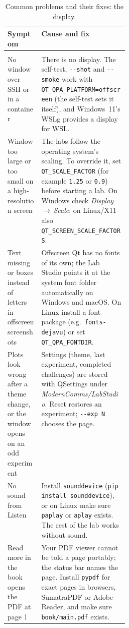 \begin{table}[htbp]\centering\footnotesize
\caption{Common problems and their fixes: the display.}\label{tab:appB:trouble3}
\renewcommand{\arraystretch}{1.2}
\begin{tabularx}{\linewidth}{@{}>{\raggedright\arraybackslash}p{0.28\linewidth}>{\raggedright\arraybackslash}X@{}}
\toprule
Symptom & Cause and fix\\
\midrule
\multicolumn{2}{@{}l}{\textit{Display}}\\
No window over SSH or in a container & There is no display. The self-test, \texttt{-{}-shot} and \texttt{-{}-smoke} work with \texttt{QT\_QPA\_PLATFORM=offscreen} (the self-test sets it itself), and Windows~11's WSLg provides a display for WSL.\\
Window too large or too small on a high-resolution screen & The labs follow the operating system's scaling. To override it, set \texttt{QT\_SCALE\_FACTOR} (for example \texttt{1.25} or \texttt{0.9}) before starting a lab. On Windows check \emph{Display\,$\to$\,Scale}; on Linux/X11 also \texttt{QT\_SCREEN\_SCALE\_FACTORS}.\\
Text missing or boxes instead of letters in offscreen screenshots & Offscreen Qt has no fonts of its own; the Lab Studio points it at the system font folder automatically on Windows and macOS. On Linux install a font package (e.g.\ \texttt{fonts-dejavu}) or set \texttt{QT\_QPA\_FONTDIR}.\\
Plots look wrong after a theme change, or the window opens on an odd experiment & Settings (theme, last experiment, completed challenges) are stored with QSettings under \emph{ModernComms/LabStudio}. \textsf{Reset} restores an experiment; \texttt{-{}-exp N} chooses the page.\\
No sound from \textsf{Listen} & Install \texttt{sounddevice} (\texttt{pip install sounddevice}), or on Linux make sure \texttt{paplay} or \texttt{aplay} exists. The rest of the lab works without sound.\\
\textsf{Read more in the book} opens the PDF at page 1 & Your PDF viewer cannot be told a page portably; the status bar names the page. Install \texttt{pypdf} for exact pages in browsers, SumatraPDF or Adobe Reader, and make sure \texttt{book/main.pdf} exists.\\
\bottomrule
\end{tabularx}
\end{table}

